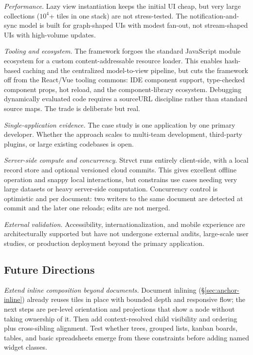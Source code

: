 \documentclass[sigplan,review,anonymous,10pt]{acmart}
\begin{document}
\emph{Performance.} Lazy view instantiation keeps the initial UI cheap, but very large collections ($10^4$+ tiles in one stack) are not stress-tested. The notification-and-sync model is built for graph-shaped UIs with modest fan-out, not stream-shaped UIs with high-volume updates.

\emph{Tooling and ecosystem.} The framework forgoes the standard JavaScript module ecosystem for a custom content-addressable resource loader. This enables hash-based caching and the centralized model-to-view pipeline, but cuts the framework off from the React/Vue tooling commons: IDE component support, type-checked component props, hot reload, and the component-library ecosystem. Debugging dynamically evaluated code requires a sourceURL discipline rather than standard source maps. The trade is deliberate but real.

\emph{Single-application evidence.} The case study is one application by one primary developer. Whether the approach scales to multi-team development, third-party plugins, or large existing codebases is open.

\emph{Server-side compute and concurrency.} Strvct runs entirely client-side, with a local record store and optional versioned cloud commits. This gives excellent offline operation and snappy local interactions, but constrains use cases needing very large datasets or heavy server-side computation. Concurrency control is optimistic and per document: two writers to the same document are detected at commit and the later one reloads; edits are not merged.

\emph{External validation.} Accessibility, internationalization, and mobile experience are architecturally supported but have not undergone external audits, large-scale user studies, or production deployment beyond the primary application.

\subsection{Future Directions}

\emph{Extend inline composition beyond documents.} Document inlining (\S\ref{sec:anchor-inline}) already reuses tiles in place with bounded depth and responsive flow; the next steps are per-level orientation and projections that show a node without taking ownership of it. Then add context-resolved child visibility and ordering plus cross-sibling alignment. Test whether trees, grouped lists, kanban boards, tables, and basic spreadsheets emerge from these constraints before adding named widget classes.
\end{document}
